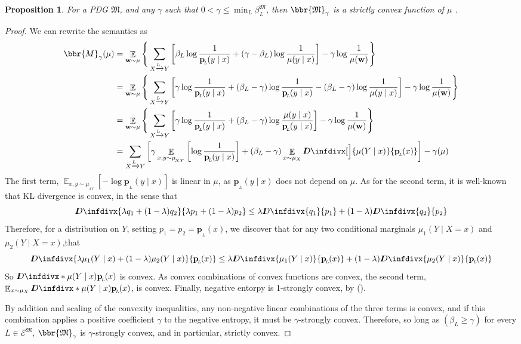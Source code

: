 \documentclass{article}
\theoremstyle{plain}
\newtheorem{prop}[theorem]{Proposition}
\theoremstyle{definition}
\theoremstyle{remark}
\newcommand{\thickD}{I\mkern-8muD}
\newcommand{\kldiv}{\thickD\infdivx}%
\let\H\relax
\DeclareMathOperator{\H}{\mathrm{H}} %
\DeclareMathOperator*{\E}{\mathbb{E}} %
\newcommand\mat[1]{\mathbf{#1}}
\newcommand{\bp}[1][L]{\mat{p}_{\!_{#1}\!}}
\newcommand{\Ed}{\mathcal E}
\newcommand{\dg}[1]{\mathfrak{#1}}
\numberwithin{equation}{section}
\begin{document}
	\begin{prop} \label{prop:convex-if-gamma-small}
		For a PDG $\dg M$, and any $\gamma$ such that $0 < \gamma \leq \min_L \beta_L^{\dg M}$, then $\bbr{\dg M}_\gamma$ is a strictly convex function of $\mu$ .%
	\end{prop}
	\begin{proof}
		We can rewrite the semantics as
		\begin{align*}
			\bbr{M}_\gamma(\mu) 
				&= \E_{\mat w \sim \mu} \Bigg\{   \sum_{ X \xrightarrow{\!\!L} Y  } \left[
					\beta_L \log \frac{1}{\bp(y\mid x)} + (\gamma - \beta_L ) \log \frac{1}{\mu(y \mid x)} \right] - \gamma \log \frac{1}{\mu(\mat w)} \Bigg\} \\
				&= \E_{\mat w \sim \mu} \Bigg\{   \sum_{ X \xrightarrow{\!\!L} Y  } \left[ \gamma \log \frac{1}{\bp(y\mid x)} + 
					(\beta_L - \gamma) \log \frac{1}{\bp(y\mid x)} - (\beta_L -\gamma) \log \frac{1}{\mu(y \mid x)} \right] - \gamma \log \frac{1}{\mu(\mat w)} \Bigg\}  \\
				&= \E_{\mat w \sim \mu} \Bigg\{   \sum_{ X \xrightarrow{\!\!L} Y  } \left[ \gamma \log \frac{1}{\bp(y\mid x)} + 
					(\beta_L - \gamma) \log \frac{\mu(y\mid x)}{\bp(y\mid x)} \right] - \gamma \log \frac{1}{\mu(\mat w)} \Bigg\} \\
				&=  \sum_{ X \xrightarrow{\!\!L} Y  } \left[ \gamma \E_{x,y \sim \mu_{\!_{XY}}} \left[\log \frac{1}{\bp(y\mid x)} \right] + 
					(\beta_L - \gamma) \E_{x\sim\mu_X} \kldiv[\Big]{\mu(Y\mid x)}{\bp( x)} \right] - \gamma \H(\mu)
		\end{align*}
		The first term, 
		\( \E_{x,y \sim \mu_{\!_{XY}}} \left[-\log {\bp(y\mid x)}\right] \) 
		is linear in $\mu$, as $\bp(y\mid x)$ does not depend on $\mu$. As for the second term, it is well-known that KL divergence is convex, in the sense that 
		\[ \kldiv{\lambda q_1 + (1-\lambda) q_2 }{ \lambda p_1 + (1-\lambda) p_2} \leq \lambda \kldiv {q_1}{ p_1} + (1-\lambda) \kldiv{q_2}{p_2} \]
		Therefore, for a distribution on $Y$, setting $p_1 = p_2 = \bp(x)$, we discover that for any two conditional marginals $\mu_1(Y \mid X=x)$ and $\mu_2(Y\mid X=x)$,that
		\[ \kldiv{\lambda \mu_1(Y\mid x) + (1-\lambda) \mu_2(Y\mid x) }{ \bp(x) } \leq \lambda \kldiv {\mu_1(Y\mid x)}{\bp(x)} + (1-\lambda) \kldiv{\mu_2(Y\mid x)}{\bp(x)} \]
		So $\kldiv*{\mu(Y\mid x)}{\bp( x)}$ is convex. As convex combinations of convex functions are convex, the second term, $\E_{x\sim\mu_X}\kldiv*{\mu(Y\mid x)}{\bp( x)}$, is convex.        Finally, negative entorpy is 1-strongly convex, by ().

		By addition and scaling of the convexity inequalities, any non-negative linear combinations of the three terms is convex, and if this combination applies a positive coefficient $\gamma$ to the negative entropy, it must be $\gamma$-strongly convex. Therefore, so long as $(\beta_L \geq \gamma)$ for every $L \in \Ed^{\dg M}$, $\bbr{\dg M}_\gamma$ is $\gamma$-strongly convex, and in particular, strictly convex.
	\end{proof}
\end{document}
